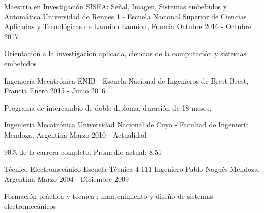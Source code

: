 
\begin{cventries}
\cventry
{Maestría en Investigación SISEA: Señal, Imagen, Sistemas embebidos y Automática}
{Universidad de Rennes 1 - Escuela Nacional Superior de Ciencias Aplicadas y Tecnológicas de
Lannion}
{Lannion, Francia} %
{Octubre 2016 - Octubre 2017} %
{
	\begin{cvitems} %
		\item{Orientación a la investigación aplicada, ciencias de la computación y sistemas
		embebidos}
	\end{cvitems}
}
\cventry
{Ingeniería Mecatrónica} %
{ENIB - Escuela Nacional de Ingenieros de Brest} %
{Brest, Francia} %
{Enero 2015 - Junio 2016} %
{
  \begin{cvitems} %
    \item {Programa de intercambio de doble diploma, duración de 18 meses.}
  \end{cvitems}
}
\cventry
{Ingeniería Mecatrónica}
{Universidad Nacional de Cuyo - Facultad de Ingeniería} %
{Mendoza, Argentina} %
{Marzo 2010 - Actualidad} %
{
	\begin{cvitems} %
		\item {90\% de la carrera completo. Promedio actual: 8.51}
	\end{cvitems}
}

\cventry
{Técnico Electromecánico} %
{Escuela Técnica 4-111 Ingeniero Pablo Nogués} %
{Mendoza, Argentina} %
{Marzo 2004 - Diciembre 2009} %
{
	\begin{cvitems} %
		\item { Formación práctica y técnica : mantenimiento y diseño de sistemas electromecánicos}
	\end{cvitems}
}
\end{cventries}

